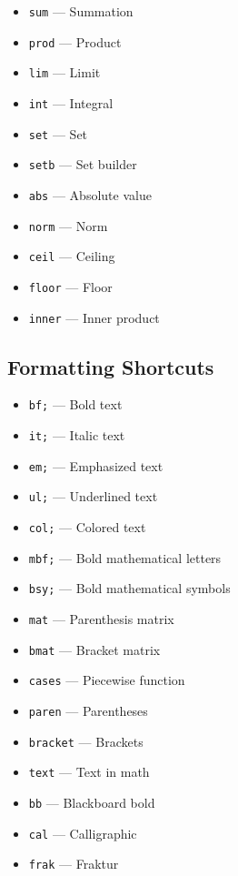 \documentclass{article}
\begin{document}
\begin{itemize}
    \item \texttt{sum} --- Summation
    \item \texttt{prod} --- Product
    \item \texttt{lim} --- Limit
    \item \texttt{int} --- Integral
    \item \texttt{set} --- Set
    \item \texttt{setb} --- Set builder
    \item \texttt{abs} --- Absolute value
    \item \texttt{norm} --- Norm
    \item \texttt{ceil} --- Ceiling
    \item \texttt{floor} --- Floor
    \item \texttt{inner} --- Inner product
\end{itemize}

\subsection{Formatting Shortcuts}

\begin{itemize}
    \item \texttt{bf;} --- Bold text
    \item \texttt{it;} --- Italic text
    \item \texttt{em;} --- Emphasized text
    \item \texttt{ul;} --- Underlined text
    \item \texttt{col;} --- Colored text
    \item \texttt{mbf;} --- Bold mathematical letters
    \item \texttt{bsy;} --- Bold mathematical symbols
    \item \texttt{mat} --- Parenthesis matrix
    \item \texttt{bmat} --- Bracket matrix
    \item \texttt{cases} --- Piecewise function
    \item \texttt{paren} --- Parentheses
    \item \texttt{bracket} --- Brackets
    \item \texttt{text} --- Text in math
    \item \texttt{bb} --- Blackboard bold
    \item \texttt{cal} --- Calligraphic
    \item \texttt{frak} --- Fraktur
\end{itemize}
\end{document}
